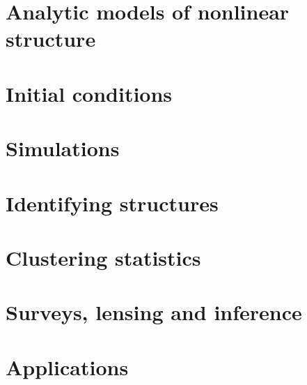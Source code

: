 \documentclass[11pt,a4paper,twoside,openright]{book}
\begin{document}
\part{Analytic models of nonlinear structure}





\part{Initial conditions}



\part{Simulations}







\part{Identifying structures}




\part{Clustering statistics}





\part{Surveys, lensing and inference}





\part{Applications}


\appendix



\backmatter

\cleardoublepage
{}
{}

\cleardoublepage{}
\printindex
\end{document}
